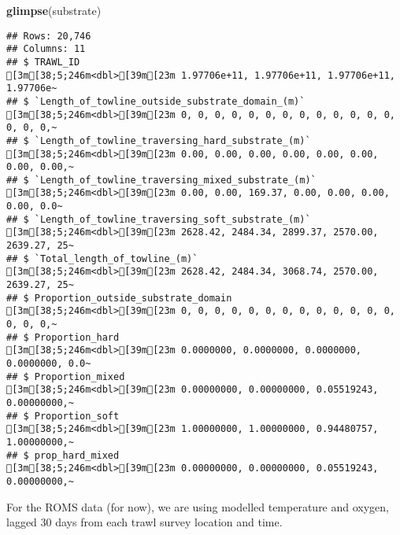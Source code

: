 \documentclass[
]{article}
\newenvironment{Shaded}{\begin{snugshade}}{\end{snugshade}}
\newcommand{\DecValTok}[1]{\textcolor[rgb]{0.00,0.00,0.81}{#1}}
\newcommand{\KeywordTok}[1]{\textcolor[rgb]{0.13,0.29,0.53}{\textbf{#1}}}
\newcommand{\NormalTok}[1]{#1}
\newcommand{\OperatorTok}[1]{\textcolor[rgb]{0.81,0.36,0.00}{\textbf{#1}}}
\newcommand{\StringTok}[1]{\textcolor[rgb]{0.31,0.60,0.02}{#1}}
\begin{document}
\begin{Shaded}
\begin{Highlighting}[]
\KeywordTok{glimpse}\NormalTok{(substrate)}
\end{Highlighting}
\end{Shaded}

\begin{verbatim}
## Rows: 20,746
## Columns: 11
## $ TRAWL_ID                                           [3m[38;5;246m<dbl>[39m[23m 1.97706e+11, 1.97706e+11, 1.97706e+11, 1.97706e~
## $ `Length_of_towline_outside_substrate_domain_(m)`   [3m[38;5;246m<dbl>[39m[23m 0, 0, 0, 0, 0, 0, 0, 0, 0, 0, 0, 0, 0, 0, 0, 0,~
## $ `Length_of_towline_traversing_hard_substrate_(m)`  [3m[38;5;246m<dbl>[39m[23m 0.00, 0.00, 0.00, 0.00, 0.00, 0.00, 0.00, 0.00,~
## $ `Length_of_towline_traversing_mixed_substrate_(m)` [3m[38;5;246m<dbl>[39m[23m 0.00, 0.00, 169.37, 0.00, 0.00, 0.00, 0.00, 0.0~
## $ `Length_of_towline_traversing_soft_substrate_(m)`  [3m[38;5;246m<dbl>[39m[23m 2628.42, 2484.34, 2899.37, 2570.00, 2639.27, 25~
## $ `Total_length_of_towline_(m)`                      [3m[38;5;246m<dbl>[39m[23m 2628.42, 2484.34, 3068.74, 2570.00, 2639.27, 25~
## $ Proportion_outside_substrate_domain                [3m[38;5;246m<dbl>[39m[23m 0, 0, 0, 0, 0, 0, 0, 0, 0, 0, 0, 0, 0, 0, 0, 0,~
## $ Proportion_hard                                    [3m[38;5;246m<dbl>[39m[23m 0.0000000, 0.0000000, 0.0000000, 0.0000000, 0.0~
## $ Proportion_mixed                                   [3m[38;5;246m<dbl>[39m[23m 0.00000000, 0.00000000, 0.05519243, 0.00000000,~
## $ Proportion_soft                                    [3m[38;5;246m<dbl>[39m[23m 1.00000000, 1.00000000, 0.94480757, 1.00000000,~
## $ prop_hard_mixed                                    [3m[38;5;246m<dbl>[39m[23m 0.00000000, 0.00000000, 0.05519243, 0.00000000,~
\end{verbatim}

For the ROMS data (for now), we are using modelled temperature and
oxygen, lagged 30 days from each trawl survey location and time.

\begin{Shaded}
\end{Shaded}
\end{document}

